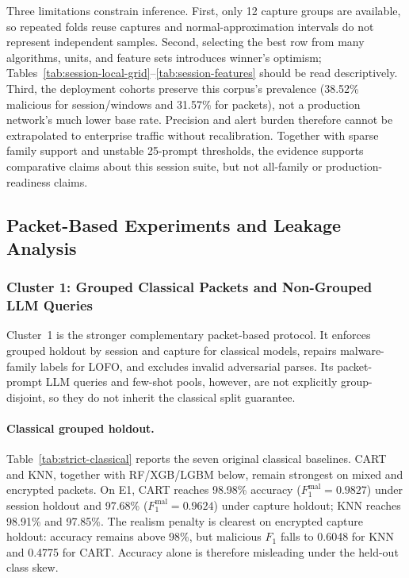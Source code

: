 \documentclass[letterpaper,twocolumn,10pt]{article}
\begin{document}
Three limitations constrain inference. First, only 12 capture groups are available, so repeated folds reuse captures and normal-approximation intervals do not represent independent samples. Second, selecting the best row from many algorithms, units, and feature sets introduces winner's optimism; Tables~\ref{tab:session-local-grid}--\ref{tab:session-features} should be read descriptively. Third, the deployment cohorts preserve this corpus's prevalence (38.52\% malicious for session/windows and 31.57\% for packets), not a production network's much lower base rate. Precision and alert burden therefore cannot be extrapolated to enterprise traffic without recalibration. Together with sparse family support and unstable 25-prompt thresholds, the evidence supports comparative claims about this session suite, but not all-family or production-readiness claims.

\subsection{Packet-Based Experiments and Leakage Analysis}

\subsubsection{Cluster 1: Grouped Classical Packets and Non-Grouped LLM Queries}

Cluster~1 is the stronger complementary packet-based protocol. It enforces grouped holdout by session and capture for classical models, repairs malware-family labels for LOFO, and excludes invalid adversarial parses. Its packet-prompt LLM queries and few-shot pools, however, are not explicitly group-disjoint, so they do not inherit the classical split guarantee.

\paragraph{Classical grouped holdout.}
Table~\ref{tab:strict-classical} reports the seven original classical baselines. CART and KNN, together with RF/XGB/LGBM below, remain strongest on mixed and encrypted packets. On E1, CART reaches 98.98\% accuracy ($F_1^{\mathrm{mal}}=0.9827$) under session holdout and 97.68\% ($F_1^{\mathrm{mal}}=0.9624$) under capture holdout; KNN reaches 98.91\% and 97.85\%. The realism penalty is clearest on encrypted capture holdout: accuracy remains above 98\%, but malicious $F_1$ falls to 0.6048 for KNN and 0.4775 for CART. Accuracy alone is therefore misleading under the held-out class skew.
\end{document}
